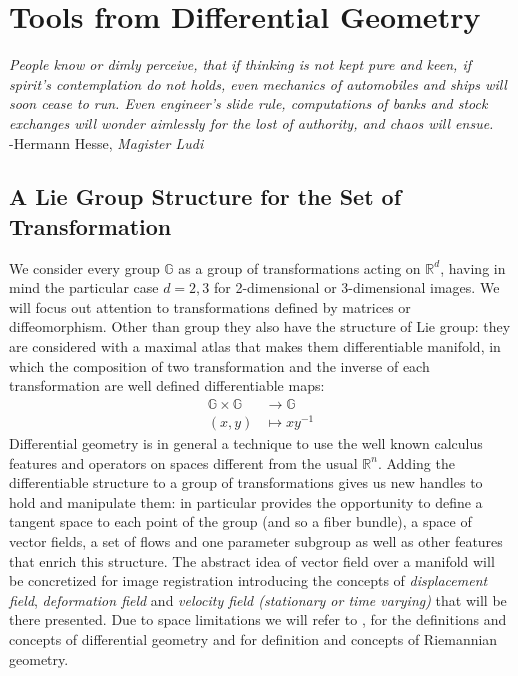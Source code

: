 \chapter{Tools from Differential Geometry}\label{ch:tools}

\begin{flushright}
	\emph{People know or dimly perceive, that if thinking is not kept pure and keen, if spirit's contemplation do not holds, even mechanics of automobiles and ships will soon cease to run. Even engineer's slide rule, computations of banks and stock exchanges will wonder aimlessly for the lost of authority, and chaos will ensue.} \\ -Hermann Hesse, \emph{Magister Ludi}
\end{flushright}

\section{A Lie Group Structure for the Set of Transformation}\label{se:finite_lie_group}

We consider every group $\mathbb{G}$ as a group of transformations acting on $\mathbb{R}^{d}$, having in mind the particular case $d=2,3$ for 2-dimensional or 3-dimensional images.
We will focus out attention to transformations defined by matrices or diffeomorphism. Other than group they also have the structure of Lie group: they are considered with a maximal atlas that makes them differentiable manifold, in which the composition of two transformation and the inverse of each transformation are well defined differentiable maps:
\begin{align*}
\mathbb{G} \times \mathbb{G} & \longrightarrow  \mathbb{G}    \\
(x,y) &\longmapsto  x y^{-1}
\end{align*}
Differential geometry is in general a technique to use the well known calculus features and operators on spaces different from the usual $\mathbb{R}^{n}$. Adding the differentiable structure to a group of transformations gives us new handles to hold and manipulate them: in particular provides the opportunity to define a tangent space to each point of the group (and so a fiber bundle), a space of vector fields, a set of flows and one parameter subgroup as well as other features that enrich this structure. The abstract idea of vector field over a manifold will be concretized for image registration introducing the concepts of \emph{displacement field}, \emph{deformation field} and \emph{velocity field (stationary or time varying)} that will be there presented. 
Due to space limitations we will refer to \cite{do1976differential}, \cite{lee2012introduction} for the definitions and concepts of differential geometry and \cite{do1992riemannian} for definition and concepts of Riemannian geometry.

